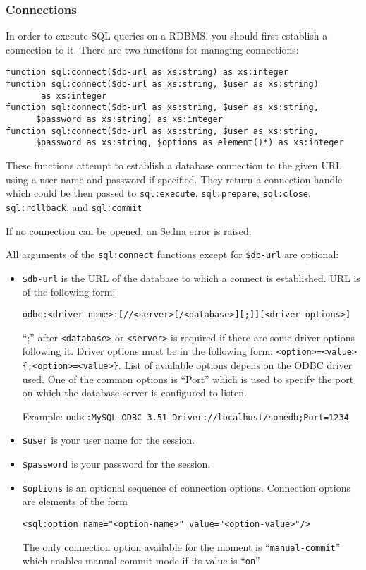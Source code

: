 \documentclass[a4paper,12pt]{article}
\begin{document}
\subsubsection*{Connections}
In order to execute SQL queries on a RDBMS, you should first establish a connection
to it. There are two functions for managing connections:

\begin{verbatim}
function sql:connect($db-url as xs:string) as xs:integer
function sql:connect($db-url as xs:string, $user as xs:string)
       as xs:integer
function sql:connect($db-url as xs:string, $user as xs:string,
      $password as xs:string) as xs:integer
function sql:connect($db-url as xs:string, $user as xs:string,
      $password as xs:string, $options as element()*) as xs:integer
\end{verbatim}

These functions attempt to establish a database connection to the given URL using a user name and password if specified.
They return a connection handle which could be then passed to \verb!sql:execute!, \verb!sql:prepare!, \verb!sql:close!,
\verb!sql:rollback!, and \verb!sql:commit!

If no connection can be opened, an Sedna error is raised.

All arguments of  the \verb!sql:connect! functions except for \verb!$db-url! are optional:
\begin{itemize}
\item \verb!$db-url! is the URL of the database to which a connect is established.
URL is of the following form:
\begin{verbatim}
odbc:<driver name>:[//<server>[/<database>][;]][<driver options>]
\end{verbatim}
``;'' after \verb!<database>! or \verb!<server>! is required if there are some driver options following it.
Driver options must be in the following form: \verb!<option>=<value>{;<option>=<value>}!. List of available options
depens on the ODBC driver used. One of the common options is ``Port'' which is used to specify the port on which
the database server is configured to listen.

Example: \verb!odbc:MySQL ODBC 3.51 Driver://localhost/somedb;Port=1234!
\item \verb!$user! is your user name for the session.
\item \verb!$password! is your password for the session.
\item \verb!$options! is an optional sequence of connection options.
Connection options are elements of the form
\begin{verbatim}
<sql:option name="<option-name>" value="<option-value>"/>
\end{verbatim}
The only connection option available for the moment is ``\verb!manual-commit!''
which enables manual commit mode if its value is ``\verb!on!''
\end{itemize}
\end{document}
